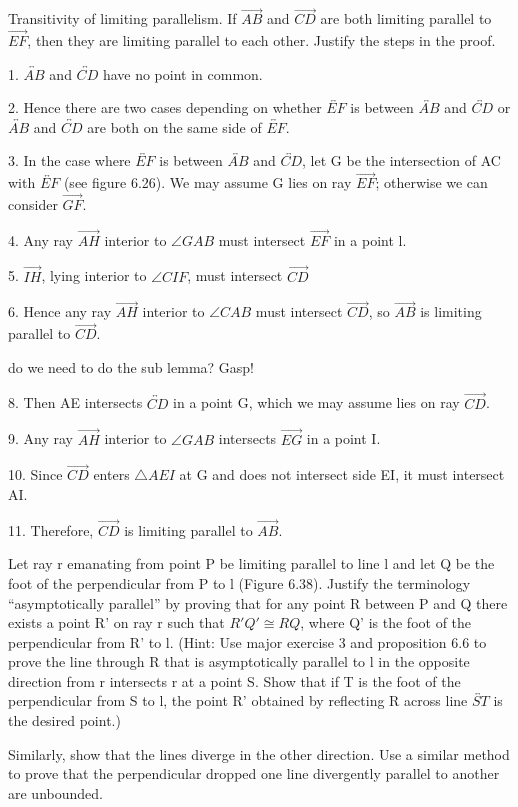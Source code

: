 \documentclass[12pt,letterpaper]{article}
\newcommand{\prob}[1]{\newpage\noindent {\bf #1}}
\begin{document}
\prob{Major Exercises 3 }

Transitivity of limiting parallelism.  If $\overrightarrow{AB}$ and $\overrightarrow{CD}$ are both limiting parallel to $\overrightarrow{EF}$, then they are limiting parallel to each other. Justify the steps in the proof.  

1. $\overleftrightarrow{AB}$ and $\overleftrightarrow{CD}$ have no point in common.

2. Hence there are two cases depending on whether $\overleftrightarrow{EF}$ is between $\overleftrightarrow{AB}$ and $\overleftrightarrow{CD}$ or $\overleftrightarrow{AB}$ and $\overleftrightarrow{CD}$ are both on the same side of $\overleftrightarrow{EF}$.

3. In the case where $\overleftrightarrow{EF}$ is between $\overleftrightarrow{AB}$ and $\overleftrightarrow{CD}$, let G be the intersection of AC with $\overleftrightarrow{EF}$ (see figure 6.26).  We may assume G lies on ray $\overrightarrow{EF}$; otherwise we can consider $\overrightarrow{GF}$.

4. Any ray $\overrightarrow{AH}$ interior to $\angle GAB$ must intersect $\overrightarrow{EF}$ in a point l.

5. $\overrightarrow{IH}$, lying interior to $\angle CIF$, must intersect $\overrightarrow{CD}$

6. Hence any ray $\overrightarrow{AH}$ interior to $\angle CAB$ must intersect $\overrightarrow{CD}$, so $\overrightarrow{AB}$ is limiting parallel to $\overrightarrow{CD}$. 

do we need to do the sub lemma? Gasp!

8. Then AE intersects $\overleftrightarrow{CD}$ in a point G, which we may assume lies on ray $\overrightarrow{CD}$. 

9. Any ray $\overrightarrow{AH}$ interior to $\angle GAB$ intersects $\overrightarrow{EG}$ in a point I.

10.  Since $\overrightarrow{CD}$ enters $\triangle AEI$ at G and does not intersect side EI, it must intersect AI.

11. Therefore, $\overrightarrow{CD}$ is limiting parallel to $\overrightarrow{AB}$. 




\prob{Major Exercises 11 } Let ray r emanating from point P be limiting parallel to line l and let Q be the foot of the perpendicular from P to l (Figure 6.38).  Justify the terminology ``asymptotically parallel'' by proving that for any point R between P and Q there exists a point R' on ray r such that $R'Q' \cong RQ$, where Q' is the foot of the perpendicular from R' to l.  (Hint: Use major exercise 3 and proposition 6.6 to prove the line through R that is asymptotically parallel to l in the opposite direction from r intersects r at a point S.  Show that if T is the foot of the perpendicular from S to l, the point R' obtained by reflecting R across line $\overleftrightarrow{ST}$ is the desired point.)

	Similarly, show that the lines diverge in the other direction.  Use a similar method to prove that the perpendicular dropped one line divergently parallel to another are unbounded. 
\end{document}
